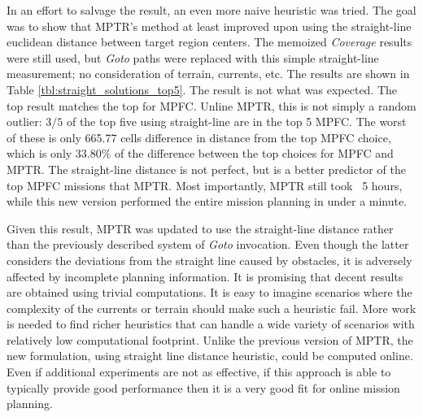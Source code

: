 \documentclass{tamuccthesis}
\begin{document}
In an effort to salvage the result, an even more naive heuristic was tried. The goal was to show that MPTR's method at least improved upon using the straight-line euclidean distance between target region centers. The memoized \textit{Coverage} results were still used, but \textit{Goto} paths were replaced with this simple straight-line measurement; no consideration of terrain, currents, etc. The results are shown in Table \ref{tbl:straight_solutions_top5}. The result is not what was expected. The top result matches the top for MPFC. Unline MPTR, this is not simply a random outlier: $3/5$ of the top five using straight-line are in the top 5 MPFC. The worst of these is only 665.77 cells difference in distance from the top MPFC choice, which is only $33.80\%$ of the difference between the top choices for MPFC and MPTR. The straight-line distance is not perfect, but is a better predictor of the top MPFC missions that MPTR. Most importantly, MPTR still took ~5 hours, while this new version performed the entire mission planning in under a minute. 

Given this result, MPTR was updated to use the straight-line distance rather than the previously described system of \textit{Goto} invocation. Even though the latter considers the deviations from the straight line caused by obstacles, it is adversely affected by incomplete planning information. It is promising that decent results are obtained using trivial computations. It is easy to imagine scenarios where the complexity of the currents or terrain should make such a heuristic fail. More work is needed to find richer heuristics that can handle a wide variety of scenarios with relatively low computational footprint. Unlike the previous version of MPTR, the new formulation, using straight line distance heuristic, could be computed online. Even if additional experiments are not as effective, if this approach is able to typically provide good performance then it is a very good fit for online mission planning. 
\end{document}
